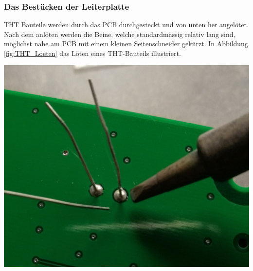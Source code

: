 \subsubsection{Das Bestücken der Leiterplatte}
{\begin{minipage}[b][6cm][t]{0.4\textwidth}
THT Bauteile werden durch das PCB durchgesteckt und von unten her angelötet. Nach dem anlöten werden die Beine, welche standardmässig relativ lang sind, möglichst nahe am PCB mit einem kleinen Seitenschneider gekürzt. In Abbildung \ref{fig:THT_Loeten} das Löten eines THT-Bauteils illustriert.
\end{minipage}}
{\begin{minipage}[b][6cm][t]{0.59\textwidth}
\centering
\includegraphics[width=0.7\linewidth]{graphics/HW_Val/THT_Loeten.jpg}
\label{fig:THT_Loeten}
\end{minipage}}

